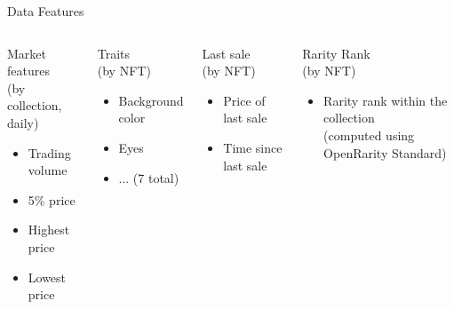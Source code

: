 \documentclass{beamer}
\begin{document}
\begin{frame}{Data Features}
    \begin{columns}[t]
        \begin{block}{Market features \\(by collection, daily)}
            \begin{itemize}
                \item Trading volume
                \item 5\% price
                \item Highest price
                \item Lowest price
            \end{itemize}
        \end{block}

        \begin{block}{Traits\\ (by NFT)}
            \begin{itemize}
                \item Background color
                \item Eyes
                \item ... (7 total)
            \end{itemize}
        \end{block}

        \begin{block}{Last sale\\ (by NFT)}
            \begin{itemize}
                \item Price of last sale
                \item Time since last sale
            \end{itemize}
        \end{block}
        \begin{block}{Rarity Rank\\ (by NFT)}
            \begin{itemize}
                \item Rarity rank within the collection\\
                (computed using OpenRarity Standard)
            \end{itemize}
        \end{block}

    \end{columns}
\end{frame}
\end{document}
